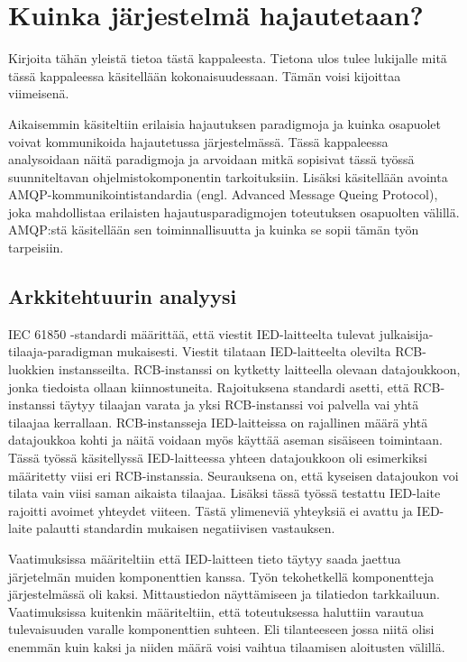 \chapter{Kuinka järjestelmä hajautetaan?}
\begin{it}
	Kirjoita tähän yleistä tietoa tästä kappaleesta. Tietona ulos tulee lukijalle mitä tässä kappaleessa käsitellään kokonaisuudessaan. Tämän voisi kijoittaa viimeisenä.
\end{it}
Aikaisemmin käsiteltiin erilaisia hajautuksen paradigmoja ja kuinka osapuolet voivat kommunikoida hajautetussa järjestelmässä. Tässä kappaleessa analysoidaan näitä paradigmoja ja arvoidaan mitkä sopisivat tässä työssä suunniteltavan ohjelmistokomponentin tarkoituksiin. Lisäksi käsitellään avointa AMQP-kommunikointistandardia (engl. Advanced Message Queing Protocol), joka mahdollistaa erilaisten hajautusparadigmojen toteutuksen osapuolten välillä. AMQP:stä käsitellään sen toiminnallisuutta ja kuinka se sopii tämän työn tarpeisiin.



\section{Arkkitehtuurin analyysi}
IEC 61850 -standardi määrittää, että viestit IED-laitteelta tulevat julkaisija-tilaaja-pa\-ra\-dig\-man mukaisesti. Viestit tilataan IED-laitteelta olevilta RCB-luokkien instansseilta. RCB-instanssi on kytketty laitteella olevaan datajoukkoon, jonka tiedoista ollaan kiinnostuneita. Rajoituksena standardi asetti, että RCB-instanssi täytyy tilaajan varata ja yksi RCB-instanssi voi palvella vai yhtä tilaajaa kerrallaan. RCB-instansseja IED-laitteissa on rajallinen määrä yhtä datajoukkoa kohti ja näitä voidaan myös käyttää aseman sisäiseen toimintaan. Tässä työssä käsitellyssä IED-laitteessa yhteen datajoukkoon oli esimerkiksi määritetty viisi eri RCB-instanssia. Seurauksena on, että kyseisen datajoukon voi tilata vain viisi saman aikaista tilaajaa. Lisäksi tässä työssä testattu IED-laite rajoitti avoimet yhteydet viiteen. Tästä ylimeneviä yhteyksiä ei avattu ja IED-laite palautti standardin mukaisen negatiivisen vastauksen.

Vaatimuksissa määriteltiin että IED-laitteen tieto täytyy saada jaettua järjetelmän muiden komponenttien kanssa. Työn tekohetkellä komponentteja järjestelmässä oli kaksi. Mittaustiedon näyttämiseen ja tilatiedon tarkkailuun. Vaatimuksissa kuitenkin määriteltiin, että toteutuksessa haluttiin varautua tulevaisuuden varalle komponenttien suhteen. Eli tilanteeseen jossa niitä olisi enemmän kuin kaksi ja niiden määrä voisi vaihtua tilaamisen aloitusten välillä. 

